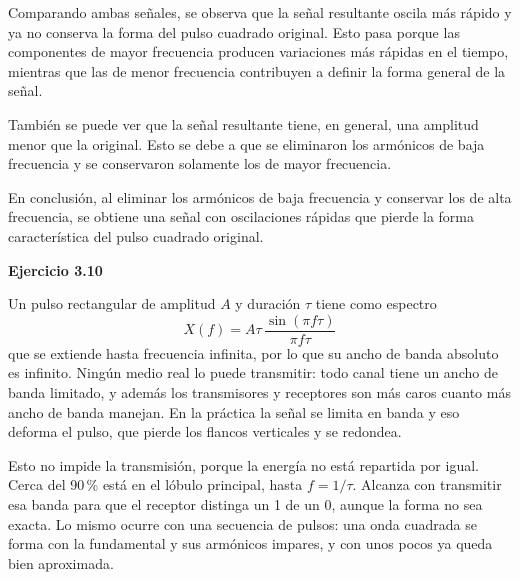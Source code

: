 \documentclass[11pt,a4paper]{article}
\begin{document}
Comparando ambas señales, se observa que la señal resultante
oscila más rápido y ya no conserva la forma del pulso cuadrado
original. Esto pasa porque las componentes de mayor frecuencia
producen variaciones más rápidas en el tiempo, mientras que las
de menor frecuencia contribuyen a definir la forma general de
la señal.

También se puede ver que la señal resultante tiene, en general,
una amplitud menor que la original. Esto se debe a que se
eliminaron los armónicos de baja frecuencia y se conservaron
solamente los de mayor frecuencia.

En conclusión, al eliminar los armónicos de baja frecuencia
y conservar los de alta frecuencia, se obtiene una señal con
oscilaciones rápidas que pierde la forma característica del
pulso cuadrado original.

\vspace{0.3cm}
\noindent\textbf{Ejercicio 3.10}\par
Un pulso rectangular de amplitud $A$ y duración $\tau$ tiene como espectro
\[
  X(f) = A\tau \,\frac{\sin(\pi f \tau)}{\pi f \tau}
\]
que se extiende hasta frecuencia infinita, por lo que su ancho de banda absoluto es infinito. Ningún medio real lo puede transmitir: todo canal tiene un ancho de banda limitado, y además los transmisores y receptores son más caros cuanto más ancho de banda manejan. En la práctica la señal se limita en banda y eso deforma el pulso, que pierde los flancos verticales y se redondea.

Esto no impide la transmisión, porque la energía no está repartida por igual. Cerca del 90\,\% está en el lóbulo principal, hasta $f = 1/\tau$. Alcanza con transmitir esa banda para que el receptor distinga un 1 de un 0, aunque la forma no sea exacta. Lo mismo ocurre con una secuencia de pulsos: una onda cuadrada se forma con la fundamental y sus armónicos impares, y con unos pocos ya queda bien aproximada.

\begin{center}
\end{center}
\end{document}
